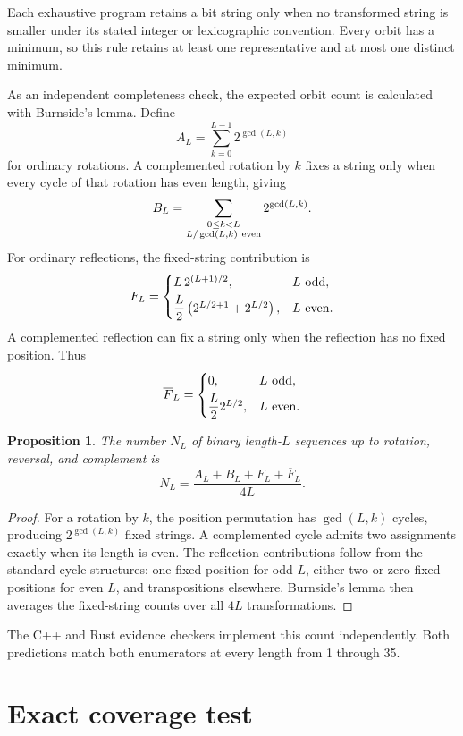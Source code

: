 \documentclass[11pt]{article}
\newtheorem{proposition}{Proposition}
\begin{document}
Each exhaustive program retains a bit string only when no transformed string
is smaller under its stated integer or lexicographic convention. Every orbit
has a minimum, so this rule retains at least one representative and at most
one distinct minimum.

As an independent completeness check, the expected orbit count is calculated
with Burnside's lemma. Define
\[
  A_L=\sum_{k=0}^{L-1}2^{\gcd(L,k)}
\]
for ordinary rotations. A complemented rotation by \(k\) fixes a string only
when every cycle of that rotation has even length, giving
\[
  B_L=
  \sum_{\substack{0\leq k<L\\
  L/\gcd(L,k)\ {\rm even}}}
  2^{\gcd(L,k)}.
\]
For ordinary reflections, the fixed-string contribution is
\[
  F_L=
  \begin{cases}
    L\,2^{(L+1)/2}, & L\ {\rm odd},\\[3pt]
    \dfrac{L}{2}\left(2^{L/2+1}+2^{L/2}\right),
      & L\ {\rm even}.
  \end{cases}
\]
A complemented reflection can fix a string only when the reflection has no
fixed position. Thus
\[
  \overline{F}_L=
  \begin{cases}
    0, & L\ {\rm odd},\\[3pt]
    \dfrac{L}{2}2^{L/2}, & L\ {\rm even}.
  \end{cases}
\]

\begin{proposition}\label{prop:burnside}
The number \(N_L\) of binary length-\(L\) sequences up to rotation,
reversal, and complement is
\[
  N_L=\frac{A_L+B_L+F_L+\overline{F}_L}{4L}.
\]
\end{proposition}

\begin{proof}
For a rotation by \(k\), the position permutation has
\(\gcd(L,k)\) cycles, producing \(2^{\gcd(L,k)}\) fixed strings. A
complemented cycle admits two assignments exactly when its length is even.
The reflection contributions follow from the standard cycle structures:
one fixed position for odd \(L\), either two or zero fixed positions for even
\(L\), and transpositions elsewhere. Burnside's lemma then averages the
fixed-string counts over all \(4L\) transformations.
\end{proof}

The C++ and Rust evidence checkers implement this count independently. Both
predictions match both enumerators at every length from 1 through 35.

\section{Exact coverage test}
\end{document}
